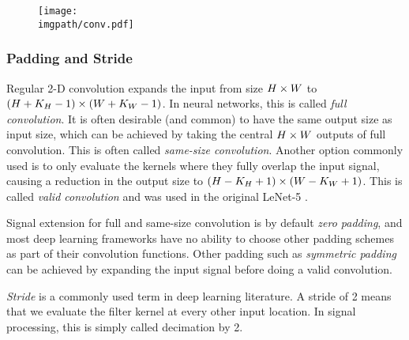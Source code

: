 \begin{figure}
  \centering
  \texttt{[image: \\imgpath/conv.pdf]}
  \label{fig:ch2:conv_layer}
\end{figure}

\subsubsection{Padding and Stride}\label{sec:ch2:padding}
Regular 2-D convolution expands the input from size $H\times W$ to $(H+K_H-1)\times
(W+K_W-1)$. In neural networks, this is called \emph{full convolution}. 
It is often desirable (and common) to
have the same output size as input size, which can be achieved by
taking the central $H\times W$ outputs of full convolution. This is often
called \emph{same-size convolution}.
Another option commonly used is to only evaluate the kernels where they fully
overlap the input signal, causing a reduction in the output size to $(H-K_H+1)
\times (W-K_W+1)$. This is called \emph{valid convolution} and was used in the
original LeNet-5 \cite{lecun_gradient-based_1998}.

Signal extension for full and same-size convolution is by default \emph{zero
padding}, and most deep learning frameworks have no ability to choose other
padding schemes as part of their convolution functions. Other padding such as
\emph{symmetric padding} can be achieved by expanding the input signal before
doing a valid convolution.

\emph{Stride} is a commonly used term in deep learning literature. A stride of 2 means
that we evaluate the filter kernel at every other input location. In signal
processing, this is simply called decimation by 2.

